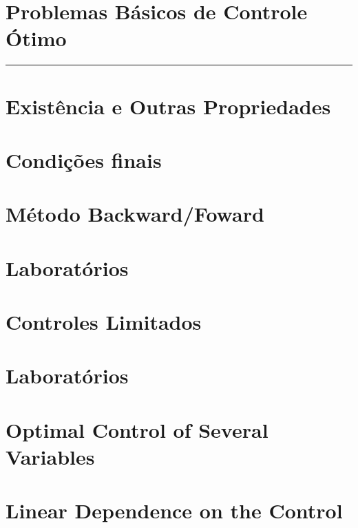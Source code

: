 \documentclass[a4paper, 11pt, oneside]{book}
\theoremstyle{definition}
\begin{document}


\tableofcontents

\chapter{Problemas Básicos de Controle Ótimo}
\label{ch:1}
\rule{\textwidth}{1pt}


\chapter{Existência e Outras Propriedades}


\chapter{Condições finais}


\chapter{Método Backward/Foward}


\chapter{Laboratórios}


\chapter{Controles Limitados}


\chapter{Laboratórios}


\chapter{Optimal Control of Several Variables}


\chapter{Linear Dependence on the Control}




\end{document}
